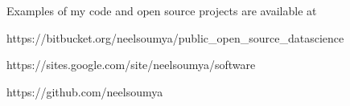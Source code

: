 \documentclass[10pt]{article}
\begin{document}
\begin{enumerate}
Examples of my code and open source projects are available at

https://bitbucket.org/neelsoumya/public\_open\_source\_datascience

https://sites.google.com/site/neelsoumya/software

https://github.com/neelsoumya



\end{enumerate}


%
%
%
%
%

%






\end{document}
